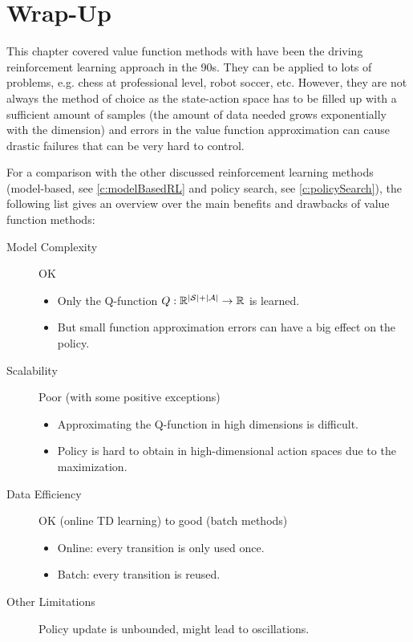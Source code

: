 	\section{Wrap-Up}
		This chapter covered value function methods with have been the driving reinforcement learning approach in the 90s. They can be applied to lots of problems, e.g. chess at professional level, robot soccer, etc. However, they are not always the method of choice as the state-action space has to be filled up with a sufficient amount of samples (the amount of data needed grows exponentially with the dimension) and errors in the value function approximation can cause drastic failures that can be very hard to control.

		For a comparison with the other discussed reinforcement learning methods (model-based, see \autoref{c:modelBasedRL} and policy search, see \autoref{c:policySearch}), the following list gives an overview over the main benefits and drawbacks of value function methods:
		\begin{description}
			\item[Model Complexity] OK
				\begin{itemize}
					\item Only the Q-function \( Q : \mathbb{R}^{\lvert \mathcal{S} \rvert + \lvert \mathcal{A} \rvert} \to \mathbb{R} \) is learned.
					\item But small function approximation errors can have a big effect on the policy.
				\end{itemize}
			\item[Scalability] Poor (with some positive exceptions)
				\begin{itemize}
					\item Approximating the Q-function in high dimensions is difficult.
					\item Policy is hard to obtain in high-dimensional action spaces due to the maximization.
				\end{itemize}
			\item[Data Efficiency] OK (online TD learning) to good (batch methods)
				\begin{itemize}
					\item Online: every transition is only used once.
					\item Batch: every transition is reused.
				\end{itemize}
			\item[Other Limitations] Policy update is unbounded, might lead to oscillations.
		\end{description}

